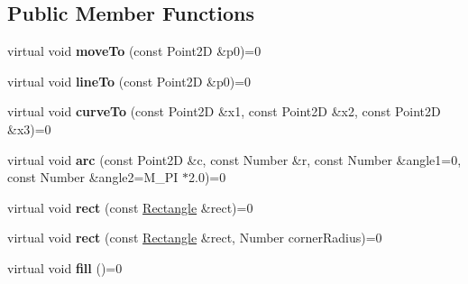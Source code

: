 \subsection*{Public Member Functions}
\begin{DoxyCompactItemize}
\item 
\hypertarget{classsambag_1_1disco_1_1_i_draw_context_a5087b239c24adb7fde90bc3a7b232715}{
virtual void {\bfseries moveTo} (const Point2D \&p0)=0}
\label{classsambag_1_1disco_1_1_i_draw_context_a5087b239c24adb7fde90bc3a7b232715}

\item 
\hypertarget{classsambag_1_1disco_1_1_i_draw_context_a6e56ef732ee024052f6461dc7ca9cd81}{
virtual void {\bfseries lineTo} (const Point2D \&p0)=0}
\label{classsambag_1_1disco_1_1_i_draw_context_a6e56ef732ee024052f6461dc7ca9cd81}

\item 
\hypertarget{classsambag_1_1disco_1_1_i_draw_context_a665245a8a3f17f4d0ecc3d64e32c69c1}{
virtual void {\bfseries curveTo} (const Point2D \&x1, const Point2D \&x2, const Point2D \&x3)=0}
\label{classsambag_1_1disco_1_1_i_draw_context_a665245a8a3f17f4d0ecc3d64e32c69c1}

\item 
\hypertarget{classsambag_1_1disco_1_1_i_draw_context_a12295a2b8a087f850f289cffda40c36a}{
virtual void {\bfseries arc} (const Point2D \&c, const Number \&r, const Number \&angle1=0, const Number \&angle2=M\_\-PI $\ast$2.0)=0}
\label{classsambag_1_1disco_1_1_i_draw_context_a12295a2b8a087f850f289cffda40c36a}

\item 
\hypertarget{classsambag_1_1disco_1_1_i_draw_context_a91ee5cf9e5910ad7994ba2769c5e3b5f}{
virtual void {\bfseries rect} (const \hyperlink{classsambag_1_1com_1_1_rectangle}{Rectangle} \&rect)=0}
\label{classsambag_1_1disco_1_1_i_draw_context_a91ee5cf9e5910ad7994ba2769c5e3b5f}

\item 
\hypertarget{classsambag_1_1disco_1_1_i_draw_context_af48bf4a4491fc0ce83223cf2773ccf8d}{
virtual void {\bfseries rect} (const \hyperlink{classsambag_1_1com_1_1_rectangle}{Rectangle} \&rect, Number cornerRadius)=0}
\label{classsambag_1_1disco_1_1_i_draw_context_af48bf4a4491fc0ce83223cf2773ccf8d}

\item 
\hypertarget{classsambag_1_1disco_1_1_i_draw_context_a6bd68f0eebceec0e50fd361e6e39a7ca}{
virtual void {\bfseries fill} ()=0}
\label{classsambag_1_1disco_1_1_i_draw_context_a6bd68f0eebceec0e50fd361e6e39a7ca}


\end{DoxyCompactItemize}
